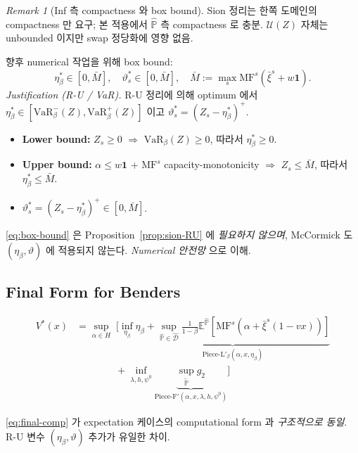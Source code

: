 \documentclass[11pt]{article}
\newcommand{\E}{\mathbb{E}}
\newcommand{\Phat}{\hat{\mathbb{P}}}
\newcommand{\Ptil}{\tilde{\mathbb{P}}}
\newcommand{\Dhat}{\hat{\mathcal{D}}}
\newcommand{\barxi}{\bar{\xi}}
\newcommand{\MF}{\mathrm{MF}}
\theoremstyle{plain}
\theoremstyle{remark}
\newtheorem{remark}{Remark}
\begin{document}
\begin{remark}[Inf 측 compactness 와 box bound]\label{rem:sion-RU-bounds}
Sion 정리는 한쪽 도메인의 compactness 만 요구; 본 적용에서 $\Phat$ 측 compactness 로 충분. $\mathcal{U}(Z)$ 자체는 unbounded 이지만 swap 정당화에 영향 없음.

향후 numerical 작업을 위해 box bound:
\begin{equation}\label{eq:box-bound}
    \eta_\beta^* \in [0, \bar M],\quad \vartheta_s^* \in [0, \bar M],\quad \bar M := \max_s \MF^s(\barxi^s + w\mathbf 1).
\end{equation}
\emph{Justification (R-U / VaR).} R-U 정리에 의해 optimum 에서 $\eta_\beta^* \in [\mathrm{VaR}_\beta^-(Z), \mathrm{VaR}_\beta^+(Z)]$ 이고 $\vartheta_s^* = (Z_s - \eta_\beta^*)^+$.
\begin{itemize}[leftmargin=*,nosep]
\item \textbf{Lower bound:} $Z_s \geq 0$ $\Rightarrow$ $\mathrm{VaR}_\beta(Z) \geq 0$, 따라서 $\eta_\beta^* \geq 0$.
\item \textbf{Upper bound:} $\alpha \leq w\mathbf 1$ + $\MF^s$ capacity-monotonicity $\Rightarrow$ $Z_s \leq \bar M$, 따라서 $\eta_\beta^* \leq \bar M$.
\item $\vartheta_s^* = (Z_s - \eta_\beta^*)^+ \in [0, \bar M]$.
\end{itemize}
\eqref{eq:box-bound} 은 Proposition~\ref{prop:sion-RU} 에 \emph{필요하지 않으며}, McCormick 도 $(\eta_\beta, \vartheta)$ 에 적용되지 않는다. \emph{Numerical 안전망} 으로 이해.
\end{remark}


\subsection{Final Form for Benders}

\begin{align}\label{eq:final-comp}
V^*(x) &= \sup_{\alpha \in H}\;\bigg[\inf_{\eta_\beta} \underbrace{\eta_\beta + \sup_{\Phat \in \Dhat}\!\tfrac{1}{1-\beta}\E^{\Phat}[\MF^s(\alpha + \barxi^s(1-vx))]}_{\text{Piece-L}'_\beta(\alpha,x,\eta_\beta)}\nonumber\\
&\qquad\qquad+ \inf_{\lambda, h, \psi^0}\underbrace{\sup_{\Ptil} g_2}_{\text{Piece-F}'(\alpha, x, \lambda, h, \psi^0)}\bigg]
\end{align}

\eqref{eq:final-comp} 가 expectation 케이스의 computational form 과 \emph{구조적으로 동일}. R-U 변수 $(\eta_\beta, \vartheta)$ 추가가 유일한 차이.
\end{document}
